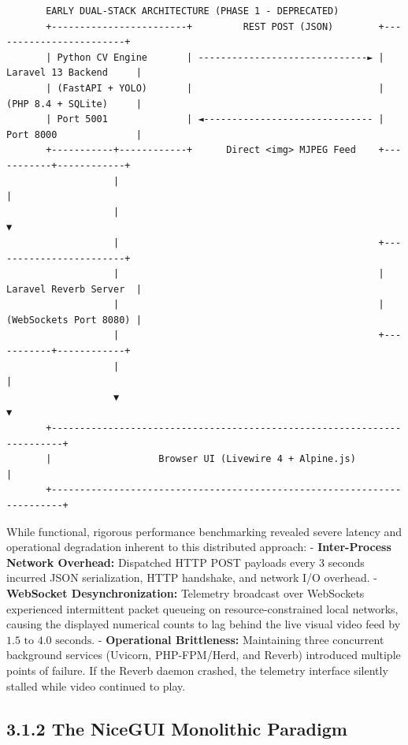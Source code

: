 \begin{verbatim}
       EARLY DUAL-STACK ARCHITECTURE (PHASE 1 - DEPRECATED)
       +------------------------+         REST POST (JSON)        +------------------------+
       | Python CV Engine       | ------------------------------► | Laravel 13 Backend     |
       | (FastAPI + YOLO)       |                                 | (PHP 8.4 + SQLite)     |
       | Port 5001              | ◄------------------------------ | Port 8000              |
       +-----------+------------+      Direct <img> MJPEG Feed    +-----------+------------+
                   |                                                          |
                   |                                                          ▼
                   |                                              +------------------------+
                   |                                              | Laravel Reverb Server  |
                   |                                              | (WebSockets Port 8080) |
                   |                                              +-----------+------------+
                   |                                                          |
                   ▼                                                          ▼
       +------------------------------------------------------------------------+
       |                   Browser UI (Livewire 4 + Alpine.js)                  |
       +------------------------------------------------------------------------+
\end{verbatim}

While functional, rigorous performance benchmarking revealed severe
latency and operational degradation inherent to this distributed
approach: - \textbf{Inter-Process Network Overhead:} Dispatched HTTP
POST payloads every 3 seconds incurred JSON serialization, HTTP
handshake, and network I/O overhead. - \textbf{WebSocket
Desynchronization:} Telemetry broadcast over WebSockets experienced
intermittent packet queueing on resource-constrained local networks,
causing the displayed numerical counts to lag behind the live visual
video feed by \(1.5\text{ to }4.0\text{ seconds}\). -
\textbf{Operational Brittleness:} Maintaining three concurrent
background services (Uvicorn, PHP-FPM/Herd, and Reverb) introduced
multiple points of failure. If the Reverb daemon crashed, the telemetry
interface silently stalled while video continued to play.

\subsection{3.1.2 The NiceGUI Monolithic
Paradigm}\label{the-nicegui-monolithic-paradigm}

